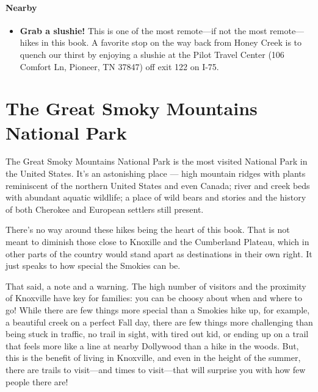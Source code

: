 \documentclass[
  letterpaper,
  DIV=11,
  numbers=noendperiod]{scrreprt}
\providecommand{\tightlist}{%
  \setlength{\itemsep}{0pt}\setlength{\parskip}{0pt}}\usepackage{longtable,booktabs,array}
\begin{document}
\subsection{Nearby}\label{nearby-18}

\begin{itemize}
\tightlist
\item
  \textbf{Grab a slushie!} This is one of the most remote---if not the
  most remote---hikes in this book. A favorite stop on the way back from
  Honey Creek is to quench our thirst by enjoying a slushie at the Pilot
  Travel Center (106 Comfort Ln, Pioneer, TN 37847) off exit 122 on
  I-75.
\end{itemize}

\part{The Great Smoky Mountains National Park}

The Great Smoky Mountains National Park is the most visited National
Park in the United States. It's an astonishing place --- high mountain
ridges with plants reminiscent of the northern United States and even
Canada; river and creek beds with abundant aquatic wildlife; a place of
wild bears and stories and the history of both Cherokee and European
settlers still present.

There's no way around these hikes being the heart of this book. That is
not meant to diminish those close to Knoxille and the Cumberland
Plateau, which in other parts of the country would stand apart as
destinations in their own right. It just speaks to how special the
Smokies can be.

That said, a note and a warning. The high number of visitors and the
proximity of Knoxville have key for families: you can be choosy about
when and where to go! While there are few things more special than a
Smokies hike up, for example, a beautiful creek on a perfect Fall day,
there are few things more challenging than being stuck in traffic, no
trail in sight, with tired out kid, or ending up on a trail that feels
more like a line at nearby Dollywood than a hike in the woods. But, this
is the benefit of living in Knoxville, and even in the height of the
summer, there are trails to visit---and times to visit---that will
surprise you with how few people there are!
\end{document}
